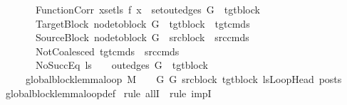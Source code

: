 \begin{isabellebody}
\ \ \ \ \ \ \ FunctionCorr{\isacharcolon}{\kern0pt}\ {\isachardoublequoteopen}{\isasymforall}x{\isasymin}set{\isacharparenleft}{\kern0pt}ls{\isacharparenright}{\kern0pt}{\isachardot}{\kern0pt}\ f\ x\ {\isasymin}\ set{\isacharparenleft}{\kern0pt}out{\isacharunderscore}{\kern0pt}edges\ G{\isacharprime}{\kern0pt}\ {\isacharbang}{\kern0pt}\ tgt{\isacharunderscore}{\kern0pt}block{\isacharparenright}{\kern0pt}{\isachardoublequoteclose}\isanewline
\ \ \ \ \ \ \ TargetBlock{\isacharcolon}{\kern0pt}\ {\isachardoublequoteopen}node{\isacharunderscore}{\kern0pt}to{\isacharunderscore}{\kern0pt}block\ G{\isacharprime}{\kern0pt}\ {\isacharbang}{\kern0pt}\ tgt{\isacharunderscore}{\kern0pt}block\ {\isacharequal}{\kern0pt}\ tgt{\isacharunderscore}{\kern0pt}cmds{\isachardoublequoteclose}\isanewline
\ \ \ \ \ \ \ SourceBlock{\isacharcolon}{\kern0pt}\ {\isachardoublequoteopen}node{\isacharunderscore}{\kern0pt}to{\isacharunderscore}{\kern0pt}block\ G\ {\isacharbang}{\kern0pt}\ src{\isacharunderscore}{\kern0pt}block\ {\isacharequal}{\kern0pt}\ src{\isacharunderscore}{\kern0pt}cmds{\isachardoublequoteclose}\isanewline
\ \ \ \ \ \ \ NotCoalesced{\isacharcolon}{\kern0pt}\ {\isachardoublequoteopen}tgt{\isacharunderscore}{\kern0pt}cmds\ {\isacharequal}{\kern0pt}\ src{\isacharunderscore}{\kern0pt}cmds{\isachardoublequoteclose}\isanewline
\ \ \ \ \ \ \ NoSuccEq{\isacharcolon}{\kern0pt}\ {\isachardoublequoteopen}ls\ {\isacharequal}{\kern0pt}\ {\isacharbrackleft}{\kern0pt}{\isacharbrackright}{\kern0pt}\ {\isasymLongrightarrow}\ out{\isacharunderscore}{\kern0pt}edges\ G{\isacharprime}{\kern0pt}\ {\isacharbang}{\kern0pt}\ tgt{\isacharunderscore}{\kern0pt}block\ {\isacharequal}{\kern0pt}\ {\isacharbrackleft}{\kern0pt}{\isacharbrackright}{\kern0pt}{\isachardoublequoteclose}\isanewline
\ \ \ \ \ {\isachardoublequoteopen}global{\isacharunderscore}{\kern0pt}block{\isacharunderscore}{\kern0pt}lemma{\isacharunderscore}{\kern0pt}loop\ M\ {\isasymLambda}\ {\isasymGamma}\ {\isasymOmega}\ G\ G{\isacharprime}{\kern0pt}\ src{\isacharunderscore}{\kern0pt}block\ tgt{\isacharunderscore}{\kern0pt}block\ lsLoopHead\ posts{\isachardoublequoteclose}\isanewline
%
\isadelimproof
%
\endisadelimproof
%
\isatagproof
{}\isamarkupfalse%
\ global{\isacharunderscore}{\kern0pt}block{\isacharunderscore}{\kern0pt}lemma{\isacharunderscore}{\kern0pt}loop{\isacharunderscore}{\kern0pt}def\isanewline
{}\isamarkupfalse%
\ {\isacharparenleft}{\kern0pt}rule\ allI\ {\isacharbar}{\kern0pt}\ rule\ impI{\isacharparenright}{\kern0pt}{\isacharplus}{\kern0pt}\isanewline

\end{isabellebody}
